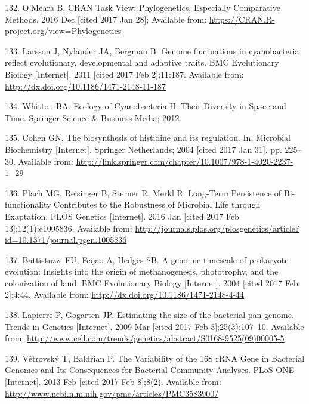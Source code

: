 \documentclass[12pt,twoside]{reedthesis}
\begin{document}
  \hypertarget{ref-omeara_cran_2016}{}
  132. O'Meara B. CRAN Task View: Phylogenetics, Especially Comparative
  Methods. 2016 Dec {[}cited 2017 Jan 28{]}; Available from:
  \url{https://CRAN.R-project.org/view=Phylogenetics}
  
  \hypertarget{ref-larsson_genome_2011}{}
  133. Larsson J, Nylander JA, Bergman B. Genome fluctuations in
  cyanobacteria reflect evolutionary, developmental and adaptive traits.
  BMC Evolutionary Biology {[}Internet{]}. 2011 {[}cited 2017 Feb
  2{]};11:187. Available from:
  \url{http://dx.doi.org/10.1186/1471-2148-11-187}
  
  \hypertarget{ref-whitton_ecology_2012}{}
  134. Whitton BA. Ecology of Cyanobacteria II: Their Diversity in Space
  and Time. Springer Science \& Business Media; 2012.
  
  \hypertarget{ref-cohen_biosynthesis_2004}{}
  135. Cohen GN. The biosynthesis of histidine and its regulation. In:
  Microbial Biochemistry {[}Internet{]}. Springer Netherlands; 2004
  {[}cited 2017 Jan 31{]}. pp. 225--30. Available from:
  \url{http://link.springer.com/chapter/10.1007/978-1-4020-2237-1_29}
  
  \hypertarget{ref-plach_long-term_2016}{}
  136. Plach MG, Reisinger B, Sterner R, Merkl R. Long-Term Persistence of
  Bi-functionality Contributes to the Robustness of Microbial Life through
  Exaptation. PLOS Genetics {[}Internet{]}. 2016 Jan {[}cited 2017 Feb
  13{]};12(1):e1005836. Available from:
  \url{http://journals.plos.org/plosgenetics/article?id=10.1371/journal.pgen.1005836}
  
  \hypertarget{ref-battistuzzi_genomic_2004}{}
  137. Battistuzzi FU, Feijao A, Hedges SB. A genomic timescale of
  prokaryote evolution: Insights into the origin of methanogenesis,
  phototrophy, and the colonization of land. BMC Evolutionary Biology
  {[}Internet{]}. 2004 {[}cited 2017 Feb 2{]};4:44. Available from:
  \url{http://dx.doi.org/10.1186/1471-2148-4-44}
  
  \hypertarget{ref-lapierre_estimating_2009}{}
  138. Lapierre P, Gogarten JP. Estimating the size of the bacterial
  pan-genome. Trends in Genetics {[}Internet{]}. 2009 Mar {[}cited 2017
  Feb 3{]};25(3):107--10. Available from:
  \url{http://www.cell.com/trends/genetics/abstract/S0168-9525(09)00005-5}
  
  \hypertarget{ref-vetrovsky_variability_2013}{}
  139. Větrovský T, Baldrian P. The Variability of the 16S rRNA Gene in
  Bacterial Genomes and Its Consequences for Bacterial Community Analyses.
  PLoS ONE {[}Internet{]}. 2013 Feb {[}cited 2017 Feb 8{]};8(2). Available
  from: \url{http://www.ncbi.nlm.nih.gov/pmc/articles/PMC3583900/}
  
\end{document}
